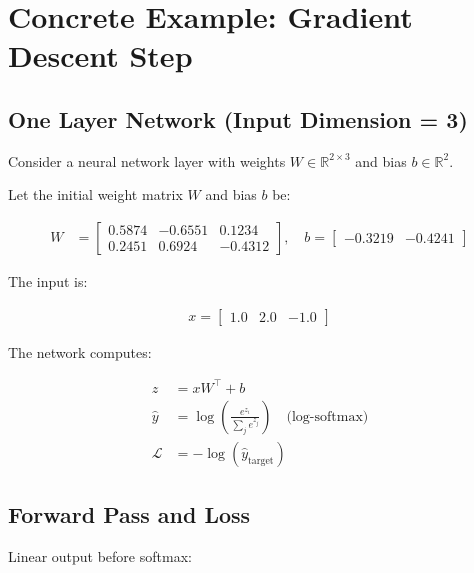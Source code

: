 \section*{Concrete Example: Gradient Descent Step}

\subsection*{One Layer Network (Input Dimension = 3)}

Consider a neural network layer with weights $W \in \mathbb{R}^{2 \times 3}$ and bias $b \in \mathbb{R}^{2}$. 

Let the initial weight matrix $W$ and bias $b$ be:

\begin{align}
	W &=
	\begin{bmatrix}
		0.5874 & -0.6551 & 0.1234 \\
		0.2451 &  0.6924 & -0.4312
	\end{bmatrix}, \quad
	b =
	\begin{bmatrix}
		-0.3219 & -0.4241
	\end{bmatrix}
\end{align}

The input is:

\begin{align}
	x = \begin{bmatrix} 1.0 & 2.0 & -1.0 \end{bmatrix}
\end{align}

The network computes:

\begin{align}
	z &= xW^\top + b \\
	\hat{y} &= \log \left( \frac{e^{z_i}}{\sum_j e^{z_j}} \right) \quad \text{(log-softmax)}\\
	\mathcal{L} &= -\log(\hat{y}_{\text{target}})
\end{align}


\subsection*{Forward Pass and Loss}

Linear output before softmax:

